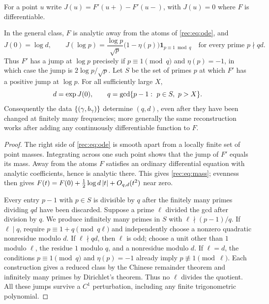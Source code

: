 For a point $u$ write $J(u)=F'(u+)-F'(u-)$, with $J(u)=0$ where $F$ is differentiable.

\begin{theorem}\label{rec:thm:jumps}
In the general class, $F$ is analytic away from the atoms of \eqref{rec:eq:ode}, and
\begin{equation}\label{rec:eq:mass}
 J(0)=\log d,\qquad
 J(\log p)=\frac{\log p}{\sqrt p}\bigl(1-\eta(p)\bigr)\mathbf 1_{p\equiv1\bmod q}
 \quad\text{for every prime }p\nmid qd .
\end{equation}
Thus $F'$ has a jump at $\log p$ precisely if $p\equiv1\pmod q$ and $\eta(p)=-1$, in which
case the jump is $2\log p/\sqrt p$. Let $S$ be the set of primes $p$ at which $F'$ has a
positive jump at $\log p$. For all sufficiently large $X$,
\[
 d=\exp J(0),\qquad q=\gcd\{p-1:\ p\in S,\ p>X\}.
\]
Consequently the data $\{(\gamma,b_\gamma)\}$ determine $(q,d)$, even after they have been
changed at finitely many frequencies; more generally the same reconstruction works after
adding any continuously differentiable function to $F$.
\end{theorem}
\begin{proof}
The right side of \eqref{rec:eq:ode} is smooth apart from a locally finite set of point
masses. Integrating across one such point shows that the jump of $F'$ equals its mass. Away
from the atoms $F$ satisfies an ordinary differential equation with analytic coefficients,
hence is analytic there. This gives \eqref{rec:eq:mass}; evenness then gives
$F(t)=F(0)+\tfrac12\log d\,\lvert t\rvert+O_{q,d}(t^2)$ near zero.

Every entry $p-1$ with $p\in S$ is divisible by $q$ after the finitely many primes dividing
$qd$ have been discarded. Suppose a prime $\ell$ divided the gcd after division by $q$. We
produce infinitely many primes in $S$ with $\ell\nmid(p-1)/q$. If $\ell\mid q$, require
$p\equiv1+q\pmod{q\ell}$ and independently choose a nonzero quadratic nonresidue modulo $d$.
If $\ell\nmid qd$, then $\ell$ is odd; choose a unit other than $1$ modulo $\ell$, the
residue $1$ modulo $q$, and a nonresidue modulo $d$. If $\ell=d$, the conditions
$p\equiv1\pmod q$ and $\eta(p)=-1$ already imply $p\not\equiv1\pmod\ell$. Each construction
gives a reduced class by the Chinese remainder theorem and infinitely many primes by
Dirichlet's theorem. Thus no $\ell$ divides the quotient. All these jumps survive a $C^1$
perturbation, including any finite trigonometric polynomial.
\end{proof}

